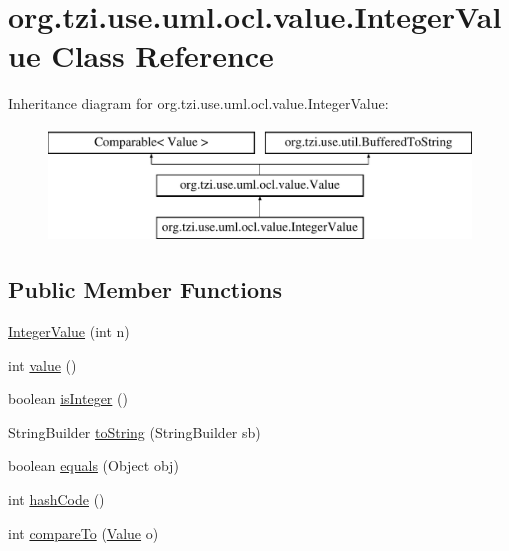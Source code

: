\hypertarget{classorg_1_1tzi_1_1use_1_1uml_1_1ocl_1_1value_1_1_integer_value}{\section{org.\-tzi.\-use.\-uml.\-ocl.\-value.\-Integer\-Value Class Reference}
\label{classorg_1_1tzi_1_1use_1_1uml_1_1ocl_1_1value_1_1_integer_value}
}
Inheritance diagram for org.\-tzi.\-use.\-uml.\-ocl.\-value.\-Integer\-Value\-:\begin{figure}[H]
\begin{center}
\leavevmode
\includegraphics[height=3.000000cm]{classorg_1_1tzi_1_1use_1_1uml_1_1ocl_1_1value_1_1_integer_value}
\end{center}
\end{figure}
\subsection*{Public Member Functions}
\begin{DoxyCompactItemize}
\item 
\hyperlink{classorg_1_1tzi_1_1use_1_1uml_1_1ocl_1_1value_1_1_integer_value_a2526919ff7627902a8ce6e1bc3c9393b}{Integer\-Value} (int n)
\item 
int \hyperlink{classorg_1_1tzi_1_1use_1_1uml_1_1ocl_1_1value_1_1_integer_value_a226842aca06fcca55c7c65f3972e99d7}{value} ()
\item 
boolean \hyperlink{classorg_1_1tzi_1_1use_1_1uml_1_1ocl_1_1value_1_1_integer_value_af1482487880fe5e7622312a80d064dc8}{is\-Integer} ()
\item 
String\-Builder \hyperlink{classorg_1_1tzi_1_1use_1_1uml_1_1ocl_1_1value_1_1_integer_value_a9052b7c7c34636051e285c747eb12a12}{to\-String} (String\-Builder sb)
\item 
boolean \hyperlink{classorg_1_1tzi_1_1use_1_1uml_1_1ocl_1_1value_1_1_integer_value_a923e09e7cc1f23b009ec710b3e82b6f4}{equals} (Object obj)
\item 
int \hyperlink{classorg_1_1tzi_1_1use_1_1uml_1_1ocl_1_1value_1_1_integer_value_a10c2f57eeeb00a0d24526c8ae6cb89cf}{hash\-Code} ()
\item 
int \hyperlink{classorg_1_1tzi_1_1use_1_1uml_1_1ocl_1_1value_1_1_integer_value_af0bd28277b6d5df58c3843583a90a6ec}{compare\-To} (\hyperlink{classorg_1_1tzi_1_1use_1_1uml_1_1ocl_1_1value_1_1_value}{Value} o)
\end{DoxyCompactItemize}
